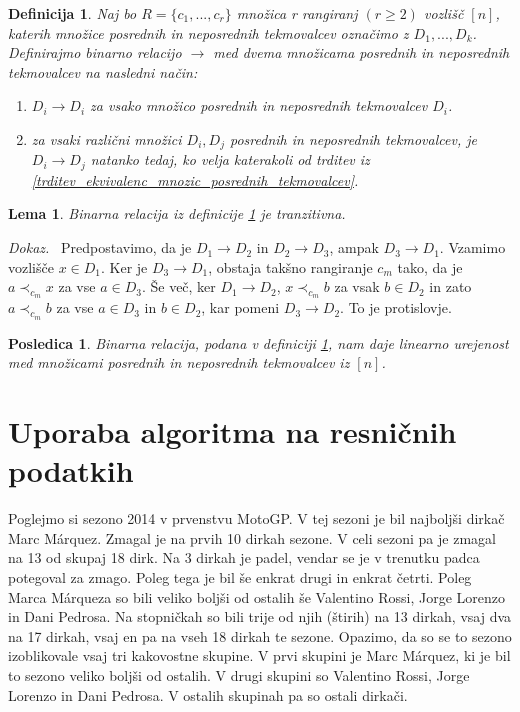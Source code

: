 \documentclass[a4paper, 12pt]{book}
\newtheorem{definicija}{Definicija}[chapter]
\newtheorem{lema}{Lema}[chapter]
\newtheorem{posledica}{Posledica}[chapter]
\newenvironment{dokaz}{\emph{Dokaz.}\ }{\hspace{\fill}{$\Box$}}
\begin{document}
\begin{definicija}
\label{definicija_relacije_mnozic_posrednih_tekmovalcev}
    Naj bo $R = \{ c_1, ..., c_r \}$ množica r rangiranj $(r \geq 2)$ vozlišč $[n]$, katerih množice posrednih in neposrednih tekmovalcev označimo z $D_1, ..., D_k$. Definirajmo binarno relacijo $\rightarrow$ med dvema množicama posrednih in neposrednih tekmovalcev na nasledni način:
    \begin{enumerate}[label=(\roman*)]
        \item $D_i \rightarrow D_i$ za vsako množico posrednih in neposrednih tekmovalcev $D_i$.
        \item za vsaki različni množici $D_i, D_j$ posrednih in neposrednih tekmovalcev, je $D_i \rightarrow D_j$ natanko tedaj, ko velja katerakoli od trditev iz \ref{trditev_ekvivalenc_mnozic_posrednih_tekmovalcev}.
    \end{enumerate}
\end{definicija}

\begin{lema}
    Binarna relacija iz definicije \ref{definicija_relacije_mnozic_posrednih_tekmovalcev} je tranzitivna.
\end{lema}
\begin{dokaz}
    Predpostavimo, da je $D_1 \rightarrow D_2$ in $D_2 \rightarrow D_3$, ampak $D_3 \rightarrow D_1$. Vzamimo vozlišče $x \in D_1$. Ker je $D_3 \rightarrow D_1$, obstaja takšno rangiranje $c_m$ tako, da je $a \prec_{c_m} x$ za vse $a \in D_3$. Še več, ker $D_1 \rightarrow D_2$, $x \prec_{c_m} b$ za vsak $b \in D_2$ in zato $a \prec_{c_m} b$ za vse $a \in D_3$ in $b \in D_2$, kar pomeni $D_3 \rightarrow D_2$. To je protislovje.
\end{dokaz}

\begin{posledica}
    Binarna relacija, podana v definiciji \ref{definicija_relacije_mnozic_posrednih_tekmovalcev}, nam daje linearno urejenost med množicami posrednih in neposrednih tekmovalcev iz $[n]$.
\end{posledica}


\section{Uporaba algoritma na resničnih podatkih}

Poglejmo si sezono 2014 v prvenstvu MotoGP. V tej sezoni je bil najboljši dirkač Marc Márquez. Zmagal je na prvih 10 dirkah sezone. V celi sezoni pa je zmagal na 13 od skupaj 18 dirk. Na 3 dirkah je padel, vendar se je v trenutku padca potegoval za zmago. Poleg tega je bil še enkrat drugi in enkrat četrti. Poleg Marca Márqueza so bili veliko boljši od ostalih še Valentino Rossi, Jorge Lorenzo in Dani Pedrosa. Na stopničkah so bili trije od njih (štirih) na 13 dirkah, vsaj dva na 17 dirkah, vsaj en pa na vseh 18 dirkah te sezone. Opazimo, da so se to sezono izoblikovale vsaj tri kakovostne skupine. V prvi skupini je Marc Márquez, ki je bil to sezono veliko boljši od ostalih. V drugi skupini so Valentino Rossi, Jorge Lorenzo in Dani Pedrosa. V ostalih skupinah pa so ostali dirkači.
\end{document}
